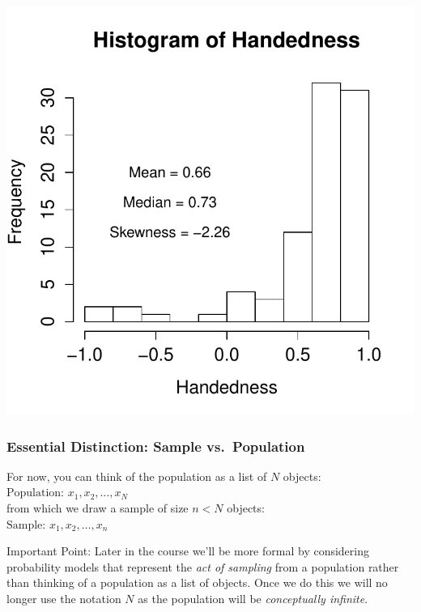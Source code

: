 \documentclass[handout]{beamer}
\begin{document}
\begin{frame}
\centering \includegraphics[scale = 0.75]{./images/handedness_skew}


\end{frame}
\begin{frame}
\frametitle{Essential Distinction: Sample vs.\ Population}
For now, you can think of the population as a list of $N$ objects:\\
	\alert{$\mbox{Population: }x_1, x_2, \hdots, x_N$}\\
from which we draw a sample of size $n<N$ objects:\\
	\alert{$\mbox{Sample: } x_1, x_2, \hdots, x_n$}
\pause
\vspace{3em}
\begin{alertblock}{Important Point:}
Later in the course we'll be more formal by considering \alert{probability models} that represent the \alert{\emph{act of sampling}} from a population rather than thinking of a population as a list of objects. Once we do this we will no longer use the notation $N$ as the population will be \alert{\emph{conceptually infinite}}.
\end{alertblock}
\end{frame}
\end{document}
